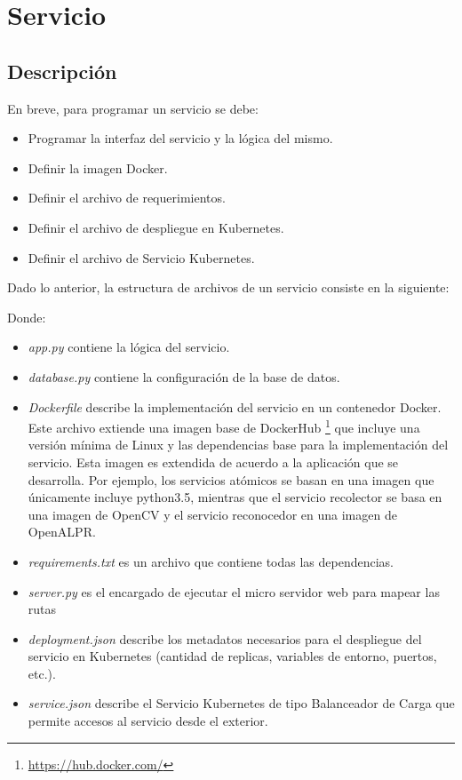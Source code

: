 \section{Servicio}
\subsection{Descripción}
En breve, para programar un servicio se debe:
\begin{itemize}
    \item Programar la interfaz del servicio y la lógica del mismo.
    \item Definir la imagen Docker.
    \item Definir el archivo de requerimientos.
    \item Definir el archivo de despliegue en Kubernetes.
    \item Definir el archivo de Servicio Kubernetes.
\end{itemize}

Dado lo anterior, la estructura de archivos de un servicio consiste en la siguiente:

{
\vspace{0.5cm}
}
\pagebreak
Donde:
\begin{itemize}
\item \textit{app.py} contiene la lógica del servicio.
\item \textit{database.py} contiene la configuración de la base de datos.
\item \textit{Dockerfile} describe la implementación del servicio en un contenedor Docker. Este archivo extiende una imagen base de DockerHub  \footnote{\url{https://hub.docker.com/}} que incluye una versión mínima de Linux y las dependencias base para la implementación del servicio. Esta imagen es extendida de acuerdo a la aplicación que se desarrolla. Por ejemplo, los servicios atómicos se basan en una imagen que únicamente incluye python3.5, mientras que el servicio recolector se basa en una imagen de OpenCV y el servicio reconocedor en una imagen de OpenALPR.
\item \textit{requirements.txt} es un archivo que contiene todas las dependencias.
\item \textit{server.py} es el encargado de ejecutar el micro servidor web para mapear las rutas 
\item \textit{deployment.json} describe los metadatos necesarios para el despliegue del servicio en Kubernetes (cantidad de replicas, variables de entorno, puertos, etc.).
\item \textit{service.json} describe el Servicio Kubernetes de tipo Balanceador de Carga que permite accesos al servicio desde el exterior.


\end{itemize}

